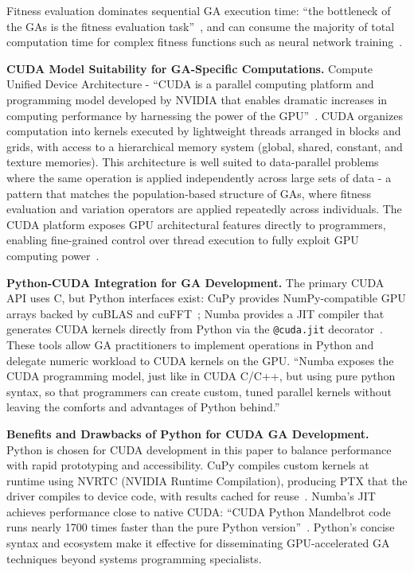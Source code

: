 Fitness evaluation dominates sequential GA execution time: ``the bottleneck of the GAs is the fitness evaluation task''~\cite{salami2002fitness}, and can consume the majority of total computation time for complex fitness functions such as neural network training~\cite{salami2002fitness}.




\textbf{CUDA Model Suitability for GA-Specific Computations.} Compute Unified Device Architecture - ``CUDA is a parallel computing platform and programming model developed by NVIDIA that enables dramatic increases in computing performance by harnessing the power of the GPU''~\cite{nvidia2023cuda}. CUDA organizes computation into kernels executed by lightweight threads arranged in blocks and grids, with access to a hierarchical memory system (global, shared, constant, and texture memories). This architecture is well suited to data-parallel problems where the same operation is applied independently across large sets of data - a pattern that matches the population-based structure of GAs, where fitness evaluation and variation operators are applied repeatedly across individuals. The CUDA platform exposes GPU architectural features directly to programmers, enabling fine-grained control over thread execution to fully exploit GPU computing power~\cite{cheng2020parallel}.

\textbf{Python-CUDA Integration for GA Development.} The primary CUDA API uses C, but Python interfaces exist: CuPy provides NumPy-compatible GPU arrays backed by cuBLAS and cuFFT~\cite{cupy_docs}; Numba provides a JIT compiler that generates CUDA kernels directly from Python via the \texttt{@cuda.jit} decorator~\cite{numba_cuda}. These tools allow GA practitioners to implement operations in Python and delegate numeric workload to CUDA kernels on the GPU. ``Numba exposes the CUDA programming model, just like in CUDA C/C++, but using pure python syntax, so that programmers can create custom, tuned parallel kernels without leaving the comforts and advantages of Python behind.''\cite{harris2017numba}

\textbf{Benefits and Drawbacks of Python for CUDA GA Development.} Python is chosen for CUDA development in this paper to balance performance with rapid prototyping and accessibility. CuPy compiles custom kernels at runtime using NVRTC (NVIDIA Runtime Compilation), producing PTX that the driver compiles to device code, with results cached for reuse~\cite{cupy_docs}. Numba's JIT achieves performance close to native CUDA: ``CUDA Python Mandelbrot code runs nearly 1700 times faster than the pure Python version''~\cite{harris2017numba}. Python's concise syntax and ecosystem make it effective for disseminating GPU-accelerated GA techniques beyond systems programming specialists.

